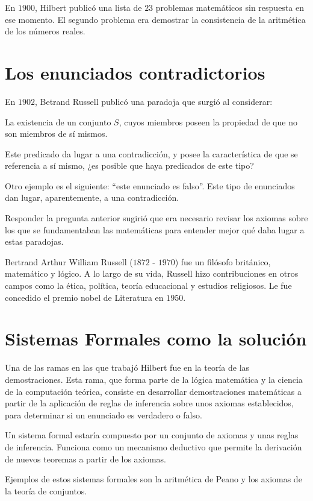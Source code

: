 \documentclass[14pt]{extarticle}
\begin{document}
En $1900$, Hilbert publicó una lista de $23$ problemas matemáticos sin respuesta en ese momento. El segundo problema era demostrar la consistencia de la aritmética de los números reales.

\section{Los enunciados contradictorios}

En $1902$, Betrand Russell publicó una paradoja que surgió al considerar: 

La existencia de un conjunto \( S \), cuyos miembros poseen la propiedad de que no son miembros de sí mismos. 

Este predicado da lugar a una contradicción, y posee la característica de que se referencia a sí mismo, ¿es posible que haya predicados de este tipo?

Otro ejemplo es el siguiente: ``este enunciado es falso''. Este tipo de enunciados dan lugar, aparentemente, a una contradicción. 

Responder la pregunta anterior sugirió que era necesario revisar los axiomas sobre los que se fundamentaban las matemáticas para entender mejor qué daba lugar a estas paradojas.

Bertrand Arthur William Russell ($1872$ - $1970$) fue un filósofo británico, matemático y lógico. A lo largo de su vida, Russell hizo contribuciones en otros campos como la ética, política, teoría educacional y estudios religiosos. Le fue concedido el premio nobel de Literatura en $1950$. \cite{russell}

\section{Sistemas Formales como la solución}

Una de las ramas en las que trabajó Hilbert fue en la teoría de las demostraciones. Esta rama, que forma parte de la lógica matemática y la ciencia de la computación teórica, consiste en desarrollar demostraciones matemáticas a partir de la aplicación de reglas de inferencia sobre unos axiomas establecidos, para determinar si un enunciado es verdadero o falso.

Un sistema formal estaría compuesto por un conjunto de axiomas y unas reglas de inferencia. Funciona como un mecanismo deductivo que permite la derivación de nuevos teoremas a partir de los axiomas. 

Ejemplos de estos sistemas formales son la aritmética de Peano y los axiomas de la teoría de conjuntos.
\end{document}
